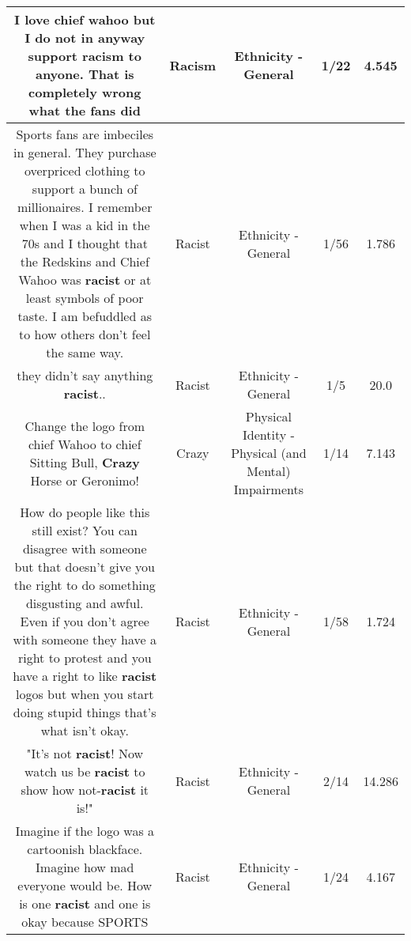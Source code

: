 \documentclass[11pt]{article}
\newlength\mylength
\begin{document}
\begin{center}
\begin{longtable}{|C{.65\mylength}|C{.30\mylength}|C{.12\mylength}|C{.12\mylength}|C{.12\mylength}|}
  \small I love chief wahoo but I do not in anyway support \textbf{racism} to anyone. That is completely wrong what the fans did\normalsize   & Racism & Ethnicity - General & 1/22 & 4.545 \\  \hline
  \small Sports fans are imbeciles in general.  They purchase overpriced clothing to support a bunch of millionaires.  I remember when I was a kid in the 70s and I thought that the Redskins and Chief Wahoo was \textbf{racist} or at least symbols of poor taste.  I am befuddled as to how others don't feel the same way.\normalsize   & Racist & Ethnicity - General & 1/56 & 1.786 \\  \hline
  \small they didn't say anything \textbf{racist}..\normalsize   & Racist & Ethnicity - General & 1/5 & 20.0 \\  \hline
  \small Change the logo from chief Wahoo to chief Sitting Bull, \textbf{Crazy} Horse or Geronimo!\normalsize   & Crazy & Physical Identity - Physical (and Mental) Impairments & 1/14 & 7.143 \\  \hline
  \small How do people like this still exist? You can disagree with someone but that doesn't give you the right to do something disgusting and awful. Even if you don't agree with someone they have a right to protest and you have a right to like \textbf{racist} logos but when you start doing stupid things that's what isn't okay.\normalsize   & Racist & Ethnicity - General & 1/58 & 1.724 \\  \hline
  \small "It's not \textbf{racist}! Now watch us be \textbf{racist} to show how not-\textbf{racist} it is!"\normalsize   & Racist & Ethnicity - General & 2/14 & 14.286 \\  \hline
  \small Imagine if the logo was a cartoonish blackface. Imagine how mad everyone would be. How is one \textbf{racist} and one is okay because SPORTS\normalsize   & Racist & Ethnicity - General & 1/24 & 4.167 \\  \hline

\end{longtable}
\end{center}
\end{document}
